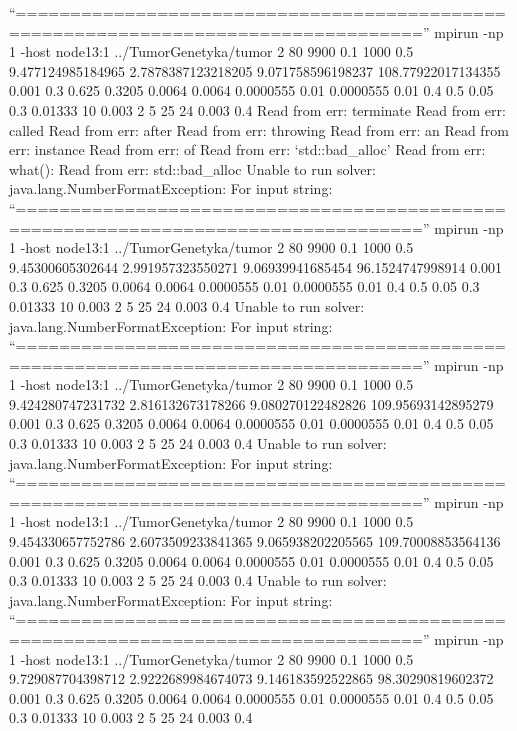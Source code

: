 \documentclass[]{article}
\begin{document}
``===================================================================================''
mpirun -np 1 -host node13:1 ../TumorGenetyka/tumor 2 80 9900 0.1 1000
0.5 9.477124985184965 2.7878387123218205 9.071758596198237
108.77922017134355 0.001 0.3 0.625 0.3205 0.0064 0.0064 0.0000555 0.01
0.0000555 0.01 0.4 0.5 0.05 0.3 0.01333 10 0.003 2 5 25 24 0.003 0.4
Read from err: terminate Read from err: called Read from err: after Read
from err: throwing Read from err: an Read from err: instance Read from
err: of Read from err: `std::bad\_alloc' Read from err: what(): Read
from err: std::bad\_alloc Unable to run solver:
java.lang.NumberFormatException: For input string:
``===================================================================================''
mpirun -np 1 -host node13:1 ../TumorGenetyka/tumor 2 80 9900 0.1 1000
0.5 9.45300605302644 2.991957323550271 9.06939941685454 96.1524747998914
0.001 0.3 0.625 0.3205 0.0064 0.0064 0.0000555 0.01 0.0000555 0.01 0.4
0.5 0.05 0.3 0.01333 10 0.003 2 5 25 24 0.003 0.4 Unable to run solver:
java.lang.NumberFormatException: For input string:
``===================================================================================''
mpirun -np 1 -host node13:1 ../TumorGenetyka/tumor 2 80 9900 0.1 1000
0.5 9.424280747231732 2.816132673178266 9.080270122482826
109.95693142895279 0.001 0.3 0.625 0.3205 0.0064 0.0064 0.0000555 0.01
0.0000555 0.01 0.4 0.5 0.05 0.3 0.01333 10 0.003 2 5 25 24 0.003 0.4
Unable to run solver: java.lang.NumberFormatException: For input string:
``===================================================================================''
mpirun -np 1 -host node13:1 ../TumorGenetyka/tumor 2 80 9900 0.1 1000
0.5 9.454330657752786 2.6073509233841365 9.065938202205565
109.70008853564136 0.001 0.3 0.625 0.3205 0.0064 0.0064 0.0000555 0.01
0.0000555 0.01 0.4 0.5 0.05 0.3 0.01333 10 0.003 2 5 25 24 0.003 0.4
Unable to run solver: java.lang.NumberFormatException: For input string:
``===================================================================================''
mpirun -np 1 -host node13:1 ../TumorGenetyka/tumor 2 80 9900 0.1 1000
0.5 9.729087704398712 2.9222689984674073 9.146183592522865
98.30290819602372 0.001 0.3 0.625 0.3205 0.0064 0.0064 0.0000555 0.01
0.0000555 0.01 0.4 0.5 0.05 0.3 0.01333 10 0.003 2 5 25 24 0.003 0.4
\end{document}
